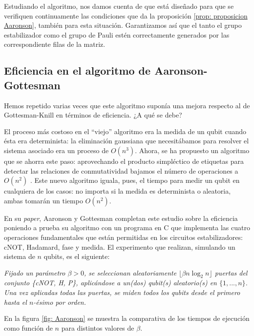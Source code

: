 \documentclass[11pt,a4paper,twoside,pdf]{article}
\numberwithin{equation}{section}
\begin{document}
	\noindent Estudiando el algoritmo, nos damos cuenta de que está diseñado para que se verifiquen continuamente las condiciones que da la proposición \ref{prop: proposicion Aaronson}, también para esta situación. Garantizamos así que el tanto el grupo estabilizador como el grupo de Pauli estén correctamente generados por las correspondiente filas de la matriz.
		
	\subsection{Eficiencia en el algoritmo de Aaronson-Gottesman}
		\label{subsec: eficiencia AaronsonGottesman}
	
	Hemos repetido varias veces que este algoritmo suponía una mejora respecto al de Gottesman-Knill en términos de eficiencia. ¿A qué se debe?
	
	El proceso más costoso en el ``viejo'' algoritmo era la medida de un qubit cuando ésta era determinista: la eliminación gaussiana que necesitábamos para resolver el sistema asociado era un proceso de $O(n^3)$. Ahora, se ha propuesto un algoritmo que se ahorra este paso: aprovechando el producto simpléctico de etiquetas para detectar las relaciones de conmutatividad bajamos el número de operaciones a $O(n^2)$ \cite{Aaronson}. Este nuevo algoritmo iguala, pues, el tiempo para medir un qubit en cualquiera de los casos: no importa si la medida es determinista o aleatoria, ambas tomarán un tiempo $O(n^2)$.
	
	En su \textit{paper}, Aaronson y Gottesman completan este estudio sobre la eficiencia poniendo a prueba su algoritmo con un programa en C que implementa las cuatro operaciones fundamentales que están permitidas en los circuitos estabilizadores: cNOT, Hadamard, fase y medida. El experimento que realizan, simulando un sistema de $n$ qubits, es el siguiente:
	
		\begin{center}
			\textit{Fijado un parámetro $\beta>0$, se seleccionan aleatoriamente $\lfloor \beta n \log_2 n \rfloor$ puertas del conjunto \{cNOT, H, P\}, aplicándose a un(dos) qubit(s) aleatorio(s) en $\{1,...,n\}$. Una vez aplicadas todas las puertas, se miden todos los qubits desde el primero hasta el $n$-ésimo por orden.}
		\end{center}
	
	En la figura \ref{fig: Aaronson} se muestra la comparativa de los tiempos de ejecución como función de $n$ para distintos valores de $\beta$.
	
\end{document}
